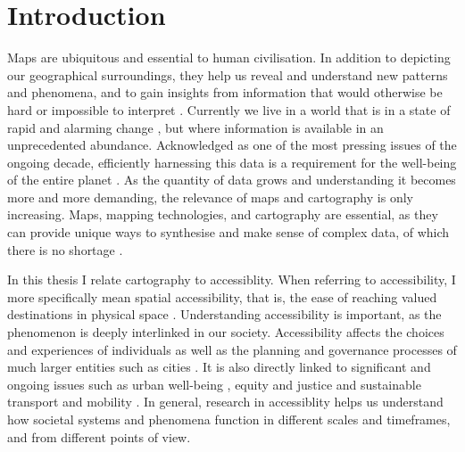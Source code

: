 \section{Introduction}



Maps are ubiquitous and essential to human civilisation.
In addition to depicting our geographical surroundings,
they help us reveal and understand new patterns and phenomena,
and to gain insights from information
that would otherwise be hard or impossible to interpret \parencite{mac2004}.
Currently we live in a world that is in a state of rapid and
alarming change \parencite{un2023},
but where information is available in an unprecedented abundance.
Acknowledged as one of the most pressing issues of the ongoing decade,
efficiently harnessing this data is a requirement
for the well-being of the entire planet \parencite{un2020}.
As the quantity of data grows
and understanding it becomes more and more demanding,
the relevance of maps and cartography is only increasing.
Maps, mapping technologies, and cartography are essential,
as they can provide unique ways to synthesise and make sense of complex data,
of which there is no shortage \parencite{kra2021}.



In this thesis I relate cartography to accessiblity.
When referring to accessibility,
I more specifically mean spatial accessibility, that is,
the ease of reaching valued destinations in physical space \parencite{lev2020}.
Understanding accessibility is important,
as the phenomenon is deeply interlinked in our society.
Accessibility affects the choices and experiences of individuals \parencite{kwa1998, kwa2003}
as well as the planning and governance processes
of much larger entities such as cities \parencite{cur2010, low2015}.
It is also directly linked to significant and ongoing issues such as
urban well-being \parencite{zha2011},
equity and justice \parencite{per2017, che2020}
and sustainable transport and mobility \parencite{son2017, mah2019}.
In general, research in accessiblity helps us understand
how societal systems and phenomena function
in different scales and timeframes, and from different points of view.

